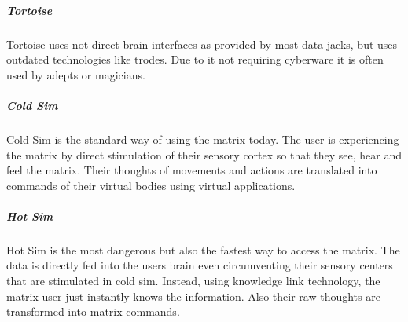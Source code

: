 \subparagraph{Tortoise}
Tortoise uses not direct brain interfaces as provided by most data jacks, but uses
outdated technologies like trodes. Due to it not requiring cyberware it is often
used by adepts or magicians.

\subparagraph{Cold Sim}
Cold Sim is the standard way of using the matrix today. The user is experiencing
the matrix by direct stimulation of their sensory cortex so that they see, hear
and feel the matrix. Their thoughts of movements and actions are translated into
commands of their virtual bodies using virtual applications.

\subparagraph{Hot Sim}
Hot Sim is the most dangerous but also the fastest way to access the matrix.
The data is directly fed into the users brain even circumventing their sensory
centers that are stimulated in cold sim. Instead, using knowledge link technology,
the matrix user just instantly knows the information. Also their raw thoughts
are transformed into matrix commands.


